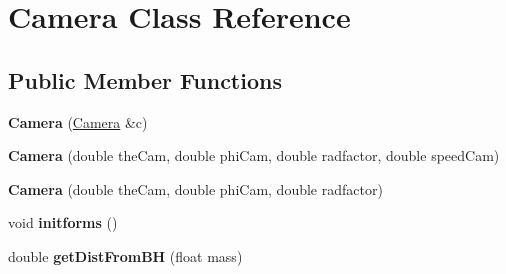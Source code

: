 \hypertarget{class_camera}{}\section{Camera Class Reference}
\label{class_camera}
\subsection*{Public Member Functions}
\begin{DoxyCompactItemize}
\item 
\mbox{\label{class_camera_aa4149cd01a03f0c5107394f6f3717ce2}} 
{\bfseries Camera} (\mbox{\hyperlink{class_camera}{Camera}} \&c)
\item 
\mbox{\label{class_camera_a2ccc83f2887f8488f99110c3623b754a}} 
{\bfseries Camera} (double the\+Cam, double phi\+Cam, double radfactor, double speed\+Cam)
\item 
\mbox{\label{class_camera_a1f7ea200f6e89fd6012d77b575b4493f}} 
{\bfseries Camera} (double the\+Cam, double phi\+Cam, double radfactor)
\item 
\mbox{\label{class_camera_ac57f0ed916653dfee9456decb031c1f5}} 
void {\bfseries initforms} ()
\item 
\mbox{\label{class_camera_a6d00dcf59c019dbbadec9009cad86d78}} 
double {\bfseries get\+Dist\+From\+BH} (float mass)
\end{DoxyCompactItemize}

